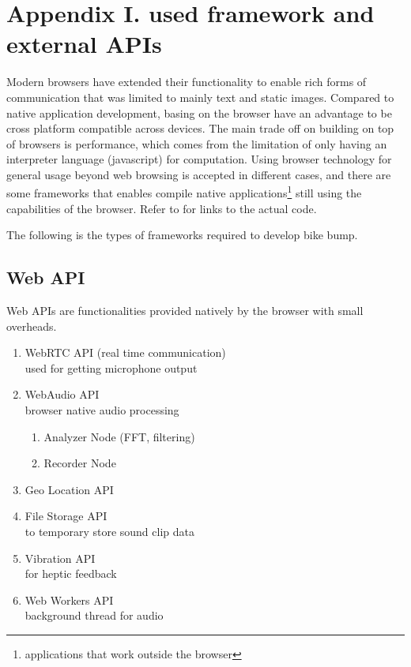 \chapter{Appendix I. used framework and external APIs}
\label{appi:api}

Modern browsers have extended their functionality to enable rich forms of communication that was limited to mainly text and static images. Compared to native application development, basing on the browser have an advantage to be cross platform compatible across devices. The main trade off on building on top of browsers is performance, which comes from the limitation of only having an interpreter language (javascript) for computation. Using browser technology for general usage beyond web browsing is accepted in different cases, and there are some frameworks that enables compile native applications\footnote{applications that work outside the browser} still using the capabilities of the browser. Refer to  for links to the actual code.

The following is the types of frameworks required to develop bike bump.

\section{Web API}
Web APIs are functionalities provided natively by the browser with small overheads.
\begin{enumerate}
    \item WebRTC API (real time communication)\\
    used for getting microphone output
    \item WebAudio API \\
    browser native audio processing
        \begin{enumerate}
            \item Analyzer Node (FFT, filtering)
            \item Recorder Node
        \end{enumerate}
    \item Geo Location API
    \item File Storage API\\
    to temporary store sound clip data
    \item Vibration API\\
    for heptic feedback
    \item Web Workers API\\
    background thread for audio
\end{enumerate}


